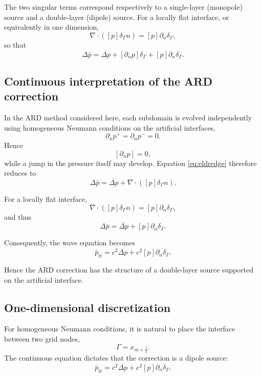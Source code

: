\documentclass[a4paper,11pt]{article}
\begin{document}
The two singular terms correspond respectively to a single-layer
(monopole) source and a double-layer (dipole) source. For a locally flat
interface, or equivalently in one dimension,
\[
\nabla\cdot([p]\delta_\Gamma n)
=
[p]\partial_n\delta_\Gamma,
\]
so that
\begin{equation}
\Delta\bar p
=
\overline{\Delta p}
+
[\partial_n p]\delta_\Gamma
+
[p]\partial_n\delta_\Gamma.
\label{eq:eldredge-flat}
\end{equation}

\subsection{Continuous interpretation of the ARD correction}

In the ARD method considered here, each subdomain is evolved independently
using homogeneous Neumann conditions on the artificial interfaces,
\[
\partial_n p^+
=
\partial_n p^-
=
0.
\]
Hence
\[
[\partial_n p]=0,
\]
while a jump in the pressure itself may develop. Equation
\eqref{eq:eldredge} therefore reduces to
\begin{equation}
\Delta\bar p
=
\overline{\Delta p}
+
\nabla\cdot([p]\delta_\Gamma n).
\label{eq:continuous-neumann}
\end{equation}

For a locally flat interface,
\[
\nabla\cdot([p]\delta_\Gamma n)
=
[p]\partial_n\delta_\Gamma,
\]
and thus
\begin{equation}
\Delta\bar p
=
\overline{\Delta p}
+
[p]\partial_n\delta_\Gamma.
\label{eq:continuous-neumann-flat}
\end{equation}

Consequently, the wave equation becomes
\begin{equation}
\bar p_{tt}
=
c^2\overline{\Delta p}
+
c^2[p]\partial_n\delta_\Gamma.
\end{equation}

Hence the ARD correction has the structure of a double-layer source
supported on the artificial interface.

\subsection{One-dimensional discretization}

For homogeneous Neumann conditions, it is natural to place the interface
between two grid nodes,
\[
\Gamma=x_{m+\frac12}.
\]
The continuous equation dictates that the correction is a dipole source:
\begin{equation}
\bar p_{tt}
=
c^2\overline{\Delta p}
+
c^2[p]\partial_n\delta_\Gamma.
\label{eq:wave-neumann-1d}
\end{equation}
\end{document}

